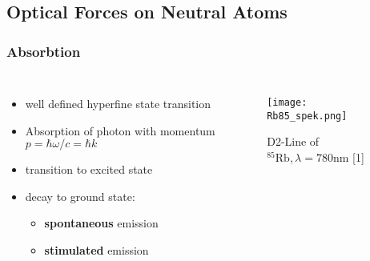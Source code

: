 \documentclass[aspectratio=169]{beamer}
\begin{document}
\subsection{Optical Forces on Neutral Atoms}

\begin{frame}
  \frametitle{Absorbtion}

  
  \begin{columns}
      \begin{itemize}[<+->]
        \item well defined hyperfine state transition
        \item Absorption of photon with momentum $p = \hbar \omega / c = \hbar k$ 
        \item transition to excited state
        \item decay to ground state:
          \begin{itemize}
            \item<4-> \textbf{spontaneous} emission
            \item<4-> \textbf{stimulated} emission   
        \end{itemize}
      \end{itemize}
       
    \begin{figure}
      \centering
      \texttt{[image: Rb85\_spek.png]}
      \caption{D2-Line of $\mathrm{^{85} Rb}, \lambda = 780$nm [1]}
      \label{fig:D2-line}
    \end{figure}
    
  \end{columns}
  
\end{frame}
\end{document}
